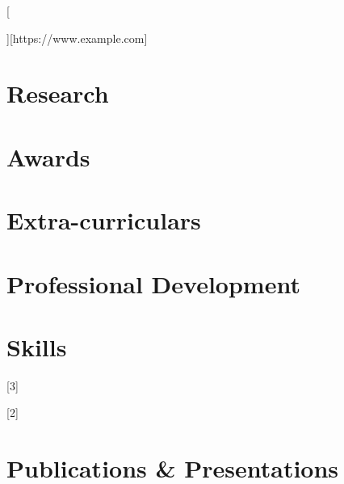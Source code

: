 \documentclass{resume} %
\begin{document}
[
    \begin{resumeitemize}
        \item \lipsum[1][1-2]
        \item \lipsum[1][2-5]
    \end{resumeitemize}
][https://www.example.com]

\section{Research}

\section{Awards}

\section{Extra-curriculars}

\section{Professional Development}

\section{Skills}

[3]

[2]


\section{Publications \& Presentations}


\footer

\end{document}
